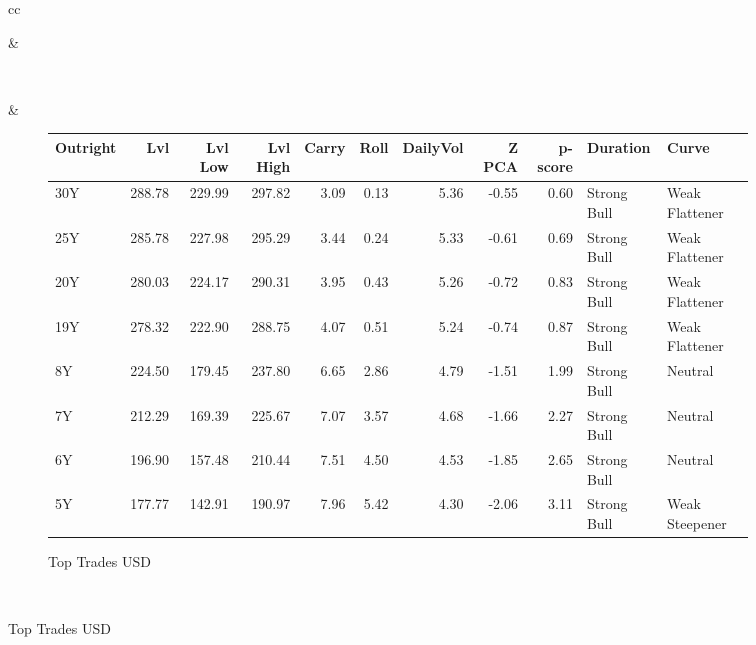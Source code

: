 \documentclass[a4paper,twoside]{report}
\begin{document}
 \begin{figure}[htbp]
 \begin{tabular}[c]{cc}
 \begin{subfigure}[l]{0.5\textwidth}
  
 \end{subfigure}&
 \begin{subfigure}[l]{0.5\textwidth}
 
 \null\hfill
 \end{subfigure}\\
 
 
 \begin{subfigure}[c]{0.5\textwidth}
 
 \null\hfill
 \end{subfigure}&
 
\begin{subfigure}[c]{0.5\textwidth}
\caption{Top Trades USD}
 \label{fig:TopTrades USD}
\begin{adjustbox}{max width=\textwidth}
\begin{tabular}{lrrrrrrrrll}
\hline
Outright &     Lvl &  Lvl Low &  Lvl High &  Carry &  Roll &  DailyVol &  Z PCA &  p-score &     Duration &           Curve \\
\hline
     30Y &  288.78 &   229.99 &    297.82 &   3.09 &  0.13 &      5.36 &  -0.55 &     0.60 &  Strong Bull &  Weak Flattener \\
     25Y &  285.78 &   227.98 &    295.29 &   3.44 &  0.24 &      5.33 &  -0.61 &     0.69 &  Strong Bull &  Weak Flattener \\
     20Y &  280.03 &   224.17 &    290.31 &   3.95 &  0.43 &      5.26 &  -0.72 &     0.83 &  Strong Bull &  Weak Flattener \\
     19Y &  278.32 &   222.90 &    288.75 &   4.07 &  0.51 &      5.24 &  -0.74 &     0.87 &  Strong Bull &  Weak Flattener \\
      8Y &  224.50 &   179.45 &    237.80 &   6.65 &  2.86 &      4.79 &  -1.51 &     1.99 &  Strong Bull &         Neutral \\
      7Y &  212.29 &   169.39 &    225.67 &   7.07 &  3.57 &      4.68 &  -1.66 &     2.27 &  Strong Bull &         Neutral \\
      6Y &  196.90 &   157.48 &    210.44 &   7.51 &  4.50 &      4.53 &  -1.85 &     2.65 &  Strong Bull &         Neutral \\
      5Y &  177.77 &   142.91 &    190.97 &   7.96 &  5.42 &      4.30 &  -2.06 &     3.11 &  Strong Bull &  Weak Steepener \\
\hline
\end{tabular}
\end{adjustbox}
\end{subfigure}\\
 

\end{tabular}
\end{figure}
\end{document}
